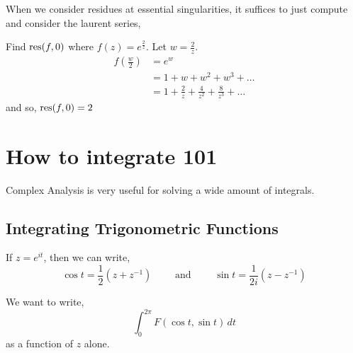 \documentclass{article}
\begin{document}
When we consider residues at essential singularities, it suffices to just compute and consider the laurent series,
\begin{eg}
  Find $\operatorname*{res} (f, 0)$ where $f(z) = e^{\frac{2}{z}}$. Let $w = \frac{2}{z}$.
  \begin{align*}
    f \left( \frac{w}{2} \right) &= e^w\\
    &= 1 + w + w^2 + w^3 + \dots\\
    &= 1 + \frac{2}{z} + \frac{4}{z^2} + \frac{8}{z^3} + \dots
  \end{align*}
  and so, $\operatorname*{res} (f, 0) = 2$
\end{eg}

\section{How to integrate 101}

Complex Analysis is very useful for solving a wide amount of integrals.

\subsection{Integrating Trigonometric Functions}

If $z = e^{it}$, then we can write,
$$ \cos t = \frac{1}{2}(z + z^{-1}) \qquad \text{ and } \qquad \sin t = \frac{1}{2i}(z - z^{-1}) $$

We want to write,
$$ \int_0^{2\pi} {F(\cos t, \sin t)\,dt} $$
as a function of $z$ alone.
\end{document}
